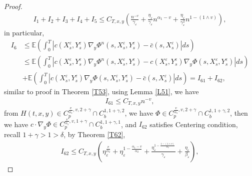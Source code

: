 \documentclass[11pt,reqno]{amsart}
\numberwithin{equation}{section}
\begin{document}
\begin{proof}
\begin{equation}\label{6.44}
	\begin{split}
I_{1}+I_{2}+I_{3}+I_{4}+I_{5}\leq C_{T,x,y}\left( \frac{n^{-v}}{\gamma_{\varepsilon}}+\frac{\eta_{\varepsilon}}{\gamma_{\varepsilon}}n^{\alpha_{1}-v}+\frac{\eta_{\varepsilon}}{\gamma_{\varepsilon}^{2}}n^{1-(1\wedge v)}\right) ,
	\end{split}
\end{equation}
in particular,
\begin{equation}\label{6.45}
	\begin{split}
	I_{6}&\leq\mathbb{E}\left( \int^{T}_{0}|c(X_{s}^{\varepsilon},Y_{s}^{\varepsilon})\nabla_{y} \Phi^{n}(s,X_{s}^{\varepsilon},Y_{s}^{\varepsilon})-\bar{c}(s,X_{s}^{\varepsilon})|ds\right) \\
		&\leq\mathbb{E}\left( \int^{T}_{0}|c(X_{s}^{\varepsilon},Y_{s}^{\varepsilon})\nabla_{y} \Phi^{n}(s,X_{s}^{\varepsilon},Y_{s}^{\varepsilon})-c(X_{s}^{\varepsilon},Y_{s}^{\varepsilon})\nabla_{y} \Phi(s,X_{s}^{\varepsilon},Y_{s}^{\varepsilon})|ds\right)\\ 
		&+\mathbb{E}\left( \int^{T}_{0}|c(X_{s}^{\varepsilon},Y_{s}^{\varepsilon})\nabla_{y} \Phi(s,X_{s}^{\varepsilon},Y_{s}^{\varepsilon})-\bar{c}(s,X_{s}^{\varepsilon})|ds\right)=I_{61}+I_{62},
	\end{split}
\end{equation}
similar to proof in Theorem \ref{T53}, using Lemma \ref{L51}, we have 
\begin{equation}\label{6.46}
	\begin{split}
		I_{61}\leq  C_{T,x,y}n^{-v},
	\end{split}
\end{equation}
from  $H(t,x,y)\in C_{p}^{\frac{v}{\alpha_{1}},v,2+\gamma}\cap C_{b}^{1,1+\gamma,2}$, we have $ \Phi \in   C_{p}^{\frac{v}{\alpha_{1}},v,2+\gamma}\cap C_{b}^{1,1+\gamma,2}$, then we have $ c\cdot \nabla_{y} \Phi \in C_{p}^{\frac{v}{\alpha_{1}},v,1+\gamma}\cap C_{b}^{1,1+\gamma,1}$,  and $I_{62} $ satisfies Centering condition, recall $1+\gamma>1>\delta$, by Theorem \ref{T62},
\begin{equation}\label{6.47}
	\begin{split}
	I_{62}\leq  C_{T,x,y} \left(\eta_{\varepsilon}^{\frac{v}{\alpha_{2}}}+\eta_{\varepsilon}^{1-\frac{\alpha_{1}-v}{\alpha_{2}}}+\frac{\eta_{\varepsilon}^{1-\frac{1-(1\wedge v)}{\alpha_{2}}}}{\gamma_{\varepsilon}}+\frac{\eta_{\varepsilon}}{\beta_{\varepsilon}}\right),
	\end{split}
\end{equation}

\end{proof}
\end{document}
